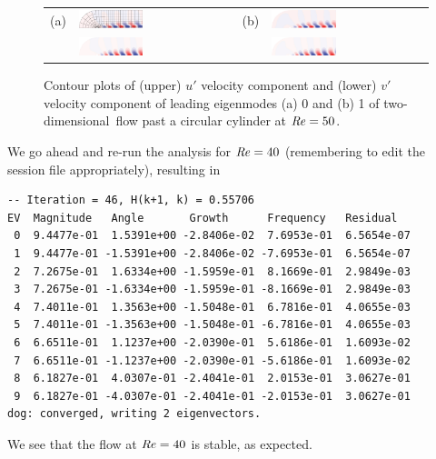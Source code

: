 \documentclass[11pt,a4paper]{report}
\newcommand\Rey{\mbox{\textit{Re}}}
\newcommand\twod{two-di\-men\-sion\-al}
\begin{document}
\begin{figure}
\begin{center}
\begin{tabular}{llll}
(a) &
\includegraphics[width=0.425\textwidth]{Re50_eig0_u_mesh.pdf} &
(b) &
\includegraphics[width=0.425\textwidth]{Re50_eig1_u.pdf} \\
&
\includegraphics[width=0.425\textwidth]{Re50_eig0_v.pdf} &
&
\includegraphics[width=0.425\textwidth]{Re50_eig1_v.pdf}
\end{tabular}
\end{center}
\caption{Contour plots of (upper) $u'$ velocity component and (lower)
  $v'$ velocity component of leading eigenmodes (a) 0 and (b) 1 of
  \twod\ flow past a circular cylinder at $\Rey=50$.}
\label{fig.semimodes}
\end{figure}

We go ahead and re-run the analysis for $\Rey=40$ (remembering to edit
the session file appropriately), resulting in
{\small
\begin{verbatim}
-- Iteration = 46, H(k+1, k) = 0.55706
EV  Magnitude   Angle       Growth      Frequency   Residual
 0  9.4477e-01  1.5391e+00 -2.8406e-02  7.6953e-01  6.5654e-07
 1  9.4477e-01 -1.5391e+00 -2.8406e-02 -7.6953e-01  6.5654e-07
 2  7.2675e-01  1.6334e+00 -1.5959e-01  8.1669e-01  2.9849e-03
 3  7.2675e-01 -1.6334e+00 -1.5959e-01 -8.1669e-01  2.9849e-03
 4  7.4011e-01  1.3563e+00 -1.5048e-01  6.7816e-01  4.0655e-03
 5  7.4011e-01 -1.3563e+00 -1.5048e-01 -6.7816e-01  4.0655e-03
 6  6.6511e-01  1.1237e+00 -2.0390e-01  5.6186e-01  1.6093e-02
 7  6.6511e-01 -1.1237e+00 -2.0390e-01 -5.6186e-01  1.6093e-02
 8  6.1827e-01  4.0307e-01 -2.4041e-01  2.0153e-01  3.0627e-01
 9  6.1827e-01 -4.0307e-01 -2.4041e-01 -2.0153e-01  3.0627e-01
dog: converged, writing 2 eigenvectors.
\end{verbatim}
}
\noindent
We see that the flow at $\Rey=40$ is stable, as expected.
\end{document}

